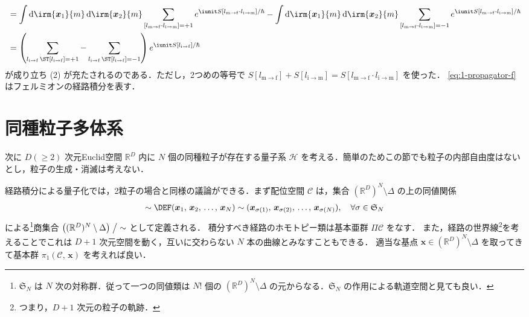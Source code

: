 \documentclass[TQFT_main]{subfiles}
\begin{document}
\begin{align}
    &=
    \int \dd{\irm{\bm{x}_1}{m}}\dd{\irm{\bm{x}_2}{m}} \sum_{[l_{\mathrm{m} \to \mathrm{f}} \cdot l_{\mathrm{i} \to \mathrm{m}}] = +1} e^{\iunit S[l_{\mathrm{m} \to \mathrm{f}} \cdot l_{\mathrm{i} \to \mathrm{m}}]/\hbar}
    -\int \dd{\irm{\bm{x}_1}{m}}\dd{\irm{\bm{x}_2}{m}} \sum_{[l_{\mathrm{m} \to \mathrm{f}} \cdot l_{\mathrm{i} \to \mathrm{m}}] = -1}e^{\iunit S[l_{\mathrm{m} \to \mathrm{f}} \cdot l_{\mathrm{i} \to \mathrm{m}}] / \hbar} \\
    &= \left( \sum_{l_{\mathrm{i} \to \mathrm{f}}\, \ST [l_{\mathrm{i} \to \mathrm{f}}] = +1} - \sum_{l_{\mathrm{i} \to \mathrm{f}}\, \ST [l_{\mathrm{i} \to \mathrm{f}}] = -1} \right) e^{\iunit S[l_{\mathrm{i} \to \mathrm{f}}]/\hbar}
\end{align}
が成り立ち (2) が充たされるのである．ただし，2つめの等号で $S[l_{\mathrm{m} \to \mathrm{f}}] + S[l_{\mathrm{i} \to \mathrm{m}}] = S[l_{\mathrm{m} \to \mathrm{f}} \cdot l_{\mathrm{i} \to \mathrm{m}}]$ を使った．
\eqref{eq:1-propagator-f}はフェルミオンの経路積分を表す．

\section{同種粒子多体系}

次に $D (\ge 2)$ 次元Euclid空間 $\mathbb{R}^D$ 内に $N$ 個の同種粒子が存在する量子系 $\mathcal{H}$ を考える．簡単のためこの節でも粒子の内部自由度はないとし，粒子の生成・消滅は考えない．

経路積分による量子化では，2粒子の場合と同様の議論ができる．まず配位空間 $\mathcal{C}$ は，集合 $(\mathbb{R}^D)^N \setminus \Delta$ の上の同値関係
\begin{align}
    \sim \DEF (\bm{x}_1,\, \bm{x}_2,\, \dots,\, \bm{x}_N) \sim (\bm{x}_{\sigma(1)},\, \bm{x}_{\sigma(2)},\, \dots,\, \bm{x}_{\sigma(N)}),\quad \forall \sigma \in \mathfrak{S}_N
\end{align}
による\footnote{$\mathfrak{S}_N$ は $N$ 次の対称群．従って一つの同値類は $N!$ 個の $(\mathbb{R}^D)^N \setminus \Delta$ の元からなる．$\mathfrak{S}_N$ の作用による軌道空間と見ても良い．}商集合 $\bigl( (\mathbb{R}^D)^N \setminus \Delta \bigr) \bigm/ {\sim}$ として定義される．
積分すべき経路のホモトピー類は基本亜群 $\Pi \mathcal{C}$ をなす．
また，経路の世界線\footnote{つまり，$D+1$ 次元の粒子の軌跡．}を考えることでこれは $D + 1$ 次元空間を動く，互いに交わらない $N$ 本の曲線とみなすこともできる．
適当な基点 $\bm{x} \in (\mathbb{R}^D)^N \setminus \Delta$ を取ってきて基本群 $\pi_1 (\mathcal{C},\, \bm{x})$ を考えれば良い．
\end{document}
